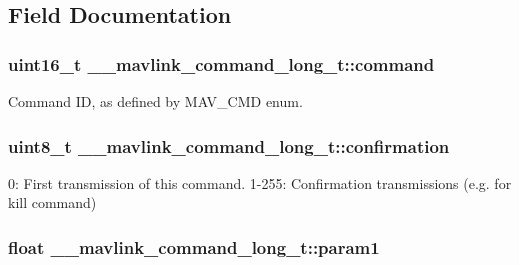 \subsection{Field Documentation}
\hypertarget{struct____mavlink__command__long__t_a059e44ecfa8fbb9f11543a81145265cf}{
\subsubsection[{command}]{\setlength{\rightskip}{0pt plus 5cm}uint16\+\_\+t \+\_\+\+\_\+mavlink\+\_\+command\+\_\+long\+\_\+t\+::command}}\label{struct____mavlink__command__long__t_a059e44ecfa8fbb9f11543a81145265cf}


Command I\+D, as defined by M\+A\+V\+\_\+\+C\+M\+D enum. 

\hypertarget{struct____mavlink__command__long__t_a79ec42e9308bf4cc44c64ae939fe1d61}{
\subsubsection[{confirmation}]{\setlength{\rightskip}{0pt plus 5cm}uint8\+\_\+t \+\_\+\+\_\+mavlink\+\_\+command\+\_\+long\+\_\+t\+::confirmation}}\label{struct____mavlink__command__long__t_a79ec42e9308bf4cc44c64ae939fe1d61}


0\+: First transmission of this command. 1-\/255\+: Confirmation transmissions (e.\+g. for kill command) 

\hypertarget{struct____mavlink__command__long__t_a8bb82d921422fd825276bbc43502fc77}{
\subsubsection[{param1}]{\setlength{\rightskip}{0pt plus 5cm}float \+\_\+\+\_\+mavlink\+\_\+command\+\_\+long\+\_\+t\+::param1}}\label{struct____mavlink__command__long__t_a8bb82d921422fd825276bbc43502fc77}


